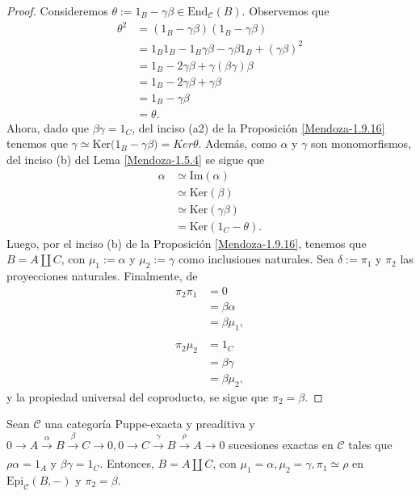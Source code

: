 \documentclass[tesis]{subfiles}
\begin{document}
\begin{proof}
    Consideremos $\theta:= 1_B-\gamma\beta\in\text{End}_\mathscr{C}(B)$. Observemos que
    \begin{align*}
        \theta^2 &= (1_B-\gamma\beta)(1_B-\gamma\beta) \\
                 &= 1_B1_B - 1_B\gamma\beta - \gamma\beta 1_B + (\gamma\beta)^2 \\
                 &= 1_B - 2\gamma\beta + \gamma(\beta\gamma)\beta \\
                 &= 1_B - 2\gamma\beta + \gamma\beta \\
                 &= 1_B-\gamma\beta \\
                 &= \theta.
    \end{align*}
    Ahora, dado que $\beta\gamma=1_C$, del inciso (a2) de la Proposición \ref{Mendoza-1.9.16} tenemos que $\gamma\simeq \text{Ker}\big(1_B-\gamma\beta\big) = Ker\theta$. Además, como $\alpha$ y $\gamma$ son monomorfismos, del inciso (b) del Lema \ref{Mendoza-1.5.4} se sigue que
    \begin{align*}
        \alpha &\simeq \text{Im}(\alpha) \\
               &\simeq \text{Ker}(\beta) \\
               &\simeq \text{Ker}(\gamma\beta) \\
               &= \text{Ker}(1_C - \theta).
    \end{align*}
    Luego, por el inciso (b) de la Proposición \ref{Mendoza-1.9.16}, tenemos que $B=A\coprod C$, con $\mu_1:=\alpha$ y $\mu_2:=\gamma$ como inclusiones naturales. Sea $\delta:=\pi_1$ y $\pi_2$ las proyecciones naturales. Finalmente, de
    \begin{align*}
        \pi_2\pi_1 &= 0 \\
                   &= \beta\alpha \\
                   &= \beta\mu_1, \\ \\
        \pi_2\mu_2 &= 1_C \\
                   &= \beta\gamma \\
                   &= \beta\mu_2,
    \end{align*}
    y la propiedad universal del coproducto, se sigue que $\pi_2=\beta$.
\end{proof}

\begin{Prop}\label{Mendoza-1.9.19}
    Sean $\mathscr{C}$ una categoría Puppe-exacta y preaditiva y $0\to A\xrightarrow[]{\alpha} B\xrightarrow[]{\beta} C\to 0, 0\to C\xrightarrow[]{\gamma} B\xrightarrow[]{\rho}A\to 0$ sucesiones exactas en $\mathscr{C}$ tales que $\rho\alpha=1_A$ y $\beta\gamma=1_C$. Entonces, $B=A\coprod C$, con $\mu_1=\alpha, \mu_2=\gamma, \pi_1\simeq\rho$ en $\text{Epi}_\mathscr{C}(B,-)$ y $\pi_2=\beta$.
\end{Prop}
\end{document}
